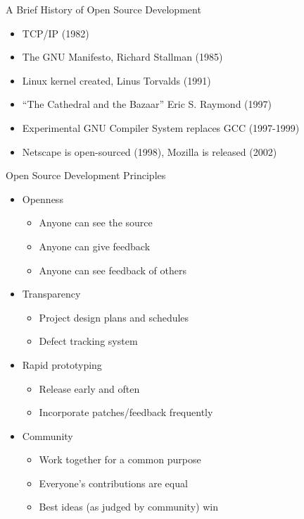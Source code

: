\documentclass{beamer}
\begin{document}
\begin{frame}{A Brief History of Open Source Development}
\begin{itemize}
\item TCP/IP (1982)
\item The GNU Manifesto, Richard Stallman (1985)
\item Linux kernel created, Linus Torvalds (1991)
\item ``The Cathedral and the Bazaar'' Eric S. Raymond (1997)
\item Experimental GNU Compiler System replaces GCC (1997-1999)
\item Netscape is open-sourced (1998), Mozilla is released (2002)
\end{itemize}
\end{frame}

\begin{frame}{Open Source Development Principles}
\begin{itemize}
\item Openness
\begin{itemize}
\item Anyone can see the source
\item Anyone can give feedback
\item Anyone can see feedback of others
\end{itemize}
\item Transparency
\begin{itemize}
\item Project design plans and schedules
\item Defect tracking system
\end{itemize}
\item Rapid prototyping
\begin{itemize}
\item Release early and often
\item Incorporate patches/feedback frequently
\end{itemize}
\item Community
\begin{itemize}
\item Work together for a common purpose
\item Everyone's contributions are equal
\item Best ideas (as judged by community) win
\end{itemize}
\end{itemize}
\end{frame}
\end{document}
